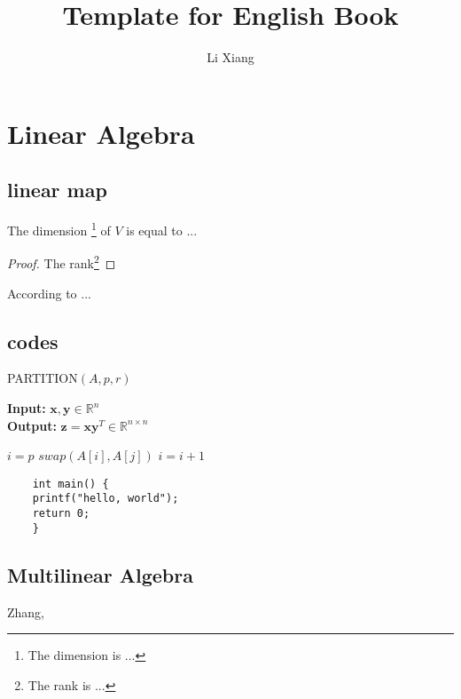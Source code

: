 \documentclass[oneside]{book}
\title{\Huge \textbf{Template for English Book}}
\author{\huge Li Xiang}
\date{}
\newtheorem{theorem}{Theorem}[chapter]
\begin{document}
\maketitle

\tableofcontents
\newpage

\setcounter{page}{1}

\chapter{Linear Algebra}
\section{linear map}

\begin{tcolorbox}
[colframe=cyan!40!black,
title={\begin{theorem}
[Rank-Nullity]\end{theorem}}]
The dimension 
\footnote{The dimension is ...}
of $V$ is equal to ...
\end{tcolorbox}

\begin{proof}
    The rank\footnote{The rank is ...}
\end{proof}
According to ...\cite{ref1}

\newpage

\section{codes}
\begin{algorithm}[!h]
	\caption{PARTITION$(A,p,r)$}%
	\textbf{Input: }{$\mathbf{x},
    \mathbf{y}\in\mathbb{R}^n$}\\
    \textbf{Output:}
    {$\mathbf{z}=\mathbf{x}
    \mathbf{y}^T\in\mathbb{R}^{n\times n}$}
    \begin{algorithmic}[1]%
		\STATE $i=p$
		\STATE $swap(A[i],A[j])$
		\STATE $i=i+1$
		\ENDIF
		\ENDFOR
    \end{algorithmic}
\end{algorithm}

\begin{verbatim}
    int main() {
    printf("hello, world");
    return 0;
    }
\end{verbatim}

\newpage

\begin{appendices}
\chapter{Multilinear Algebra}
\end{appendices}
\newpage

\begin{thebibliography}{99}
Zhang,
\end{thebibliography}
\end{document}
